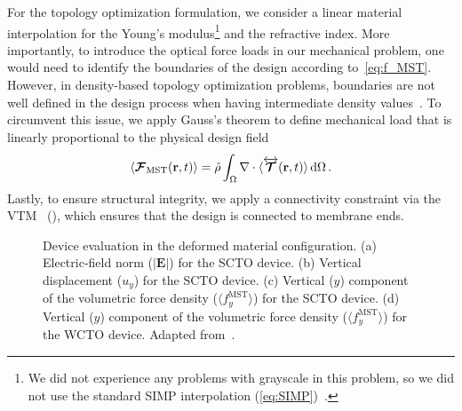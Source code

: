  For the topology optimization formulation, we consider a linear material interpolation for the Young's modulus\footnote{We did not experience any problems with grayscale in this problem, so we did not use the standard SIMP interpolation (\eqref{eq:SIMP})~\cite{SIMP}.} and the 
 refractive index. More importantly, to introduce the optical force loads in our mechanical problem, one would need to identify the boundaries of the design according to~\eqref{eq:f_MST}. However, in density-based topology optimization problems, boundaries
 are not well defined in the design process when having intermediate density values~\cite{jdara}. To circumvent this issue, we apply Gauss's theorem to
 define mechanical load that is linearly proportional to the physical design field
    \begin{equation}
 \langle \bm{\mathcal{F}}_\text{MST}(\mathbf{r},t) \rangle = \hat{\rho} \int_\Omega \nabla \cdot \langle\overleftrightarrow{\bm{\mathcal{T}}}(\mathbf{r}, t)\rangle \mathop{}\!\text{d}\Omega \,.
    \end{equation}
Lastly, to ensure structural integrity, we apply a connectivity constraint via the VTM~\cite{li_structural_2016} (), which ensures that the design is connected to membrane ends. 

\begin{figure}[tb]
    \centering
    \caption{Device evaluation in the deformed material configuration. (a) Electric-field norm ($\vert\mathbf{E}\vert$) for the SCTO device. (b) Vertical displacement ($u_y$) for the SCTO device.
     (c) Vertical ($y$) component of the volumetric force density ($\langle f^\text{MST}_y\rangle$) for the SCTO device. (d) Vertical ($y$) component of
      the volumetric force density ($\langle f^\text{MST}_y\rangle$) for the WCTO device. Adapted from~\cite{ownpub5}.}
    \label{fig:SC}
\end{figure}


